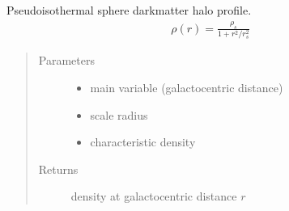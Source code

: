 \documentclass[letterpaper,10pt,english]{sphinxmanual}
\begin{document}
\begin{fulllineitems}
\label{\detokenize{diffsph.profiles:diffsph.profiles.templates.ps_iso}}
\sphinxAtStartPar
Pseudo\sphinxhyphen{}isothermal sphere dark\sphinxhyphen{}matter halo profile.
\begin{equation*}
\begin{split}\rho(r) = \frac{\rho_s}{1+r^2/r_s^2}\end{split}
\end{equation*}\begin{quote}\begin{description}
\item[{Parameters}] \leavevmode\begin{itemize}
\item {} 
\sphinxAtStartPar
{} \textendash{} main variable (galactocentric distance)

\item {} 
\sphinxAtStartPar
{} \textendash{} scale radius

\item {} 
\sphinxAtStartPar
{} \textendash{} characteristic density

\end{itemize}

\item[{Returns}] \leavevmode
\sphinxAtStartPar
density at galactocentric distance \(r\)

\end{description}\end{quote}

\end{fulllineitems}

\end{document}

